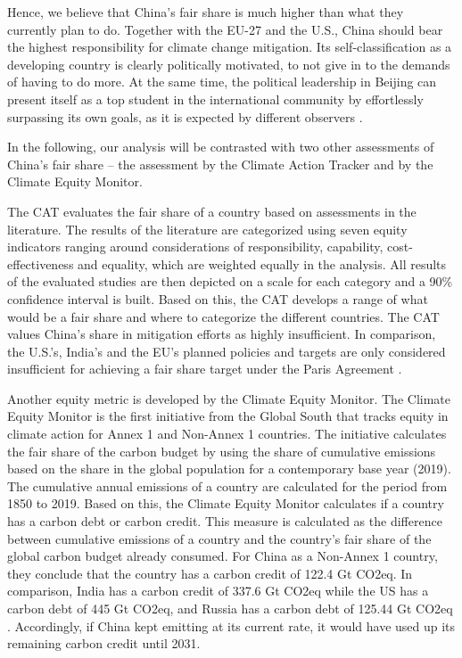 \documentclass[
  12pt,
]{article}
\numberwithin{equation}{section}
\numberwithin{table}{section}
\numberwithin{figure}{section}
\begin{document}
Hence, we believe that China's fair share is much higher than what they
currently plan to do. Together with the EU-27 and the U.S., China should
bear the highest responsibility for climate change mitigation. Its
self-classification as a developing country is clearly politically
motivated, to not give in to the demands of having to do more. At the
same time, the political leadership in Beijing can present itself as a
top student in the international community by effortlessly surpassing
its own goals, as it is expected by different observers \citep{CAT2022}.

In the following, our analysis will be contrasted with two other
assessments of China's fair share -- the assessment by the Climate
Action Tracker and by the Climate Equity Monitor.

The CAT evaluates the fair share of a country based on assessments in
the literature. The results of the literature are categorized using
seven equity indicators ranging around considerations of responsibility,
capability, cost-effectiveness and equality, which are weighted equally
in the analysis. All results of the evaluated studies are then depicted
on a scale for each category and a 90\% confidence interval is built.
Based on this, the CAT develops a range of what would be a fair share
and where to categorize the different countries. The CAT values China's
share in mitigation efforts as highly insufficient. In comparison, the
U.S.'s, India's and the EU's planned policies and targets are only
considered insufficient for achieving a fair share target under the
Paris Agreement \citep{CAT2022}.

Another equity metric is developed by the Climate Equity Monitor. The
Climate Equity Monitor is the first initiative from the Global South
that tracks equity in climate action for Annex 1 and Non-Annex 1
countries. The initiative calculates the fair share of the carbon budget
by using the share of cumulative emissions based on the share in the
global population for a contemporary base year (2019). The cumulative
annual emissions of a country are calculated for the period from 1850 to
2019. Based on this, the Climate Equity Monitor calculates if a country
has a carbon debt or carbon credit. This measure is calculated as the
difference between cumulative emissions of a country and the country's
fair share of the global carbon budget already consumed. For China as a
Non-Annex 1 country, they conclude that the country has a carbon credit
of 122.4 Gt CO2eq. In comparison, India has a carbon credit of 337.6 Gt
CO2eq while the US has a carbon debt of 445 Gt CO2eq, and Russia has a
carbon debt of 125.44 Gt CO2eq \citep{CEM2022}. Accordingly, if China
kept emitting at its current rate, it would have used up its remaining
carbon credit until 2031.
\end{document}
